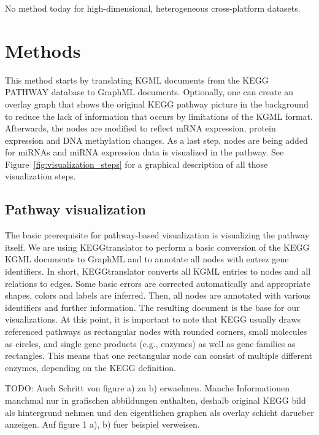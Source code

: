\documentclass{bioinfo}
\begin{document}
No method today for high-dimensional, heterogeneous cross-platform datasets.

\section{Methods}

This method starts by translating KGML documents from the KEGG PATHWAY database to GraphML documents. Optionally, one can create an overlay graph that shows the original KEGG pathway picture in the background to reduce the lack of information that occurs by limitations of the KGML format. Afterwards, the nodes are modified to reflect mRNA expression, protein expression and DNA methylation changes. As a last step, nodes are being added for miRNAs and miRNA expression data is visualized in the pathway. See Figure~\ref{fig:visualization_steps} for a graphical description of all those visualization steps.


\subsection{Pathway visualization}

The basic prerequisite for pathway-based visualization is visualizing the pathway itself. We are using KEGGtranslator \citep[see][]{Wrzodek2011} to perform a basic conversion of the KEGG KGML documents to GraphML and to annotate all nodes with entrez gene identifiers. In short, KEGGtranslator converts all KGML entries to nodes and all relations to edges. Some basic errors are corrected automatically and appropriate shapes, colors and labels are inferred. Then, all nodes are annotated with various identifiers and further information. The resulting document is the base for our visualizations. At this point, it is important to note that KEGG usually draws referenced pathways as rectangular nodes with rounded corners, small molecules as circles, and single gene products (e.g., enzymes) as well as gene families as rectangles. This means that one rectangular node can consist of multiple different enzymes, depending on the KEGG definition.

TODO: Auch Schritt von figure a) zu b) erwaehnen. Manche Informationen manchmal nur in grafischen abbildungen enthalten, deshalb original KEGG bild als hintergrund nehmen und den eigentlichen graphen als overlay schicht darueber anzeigen. Auf figure 1 a), b) fuer beispiel verweisen.
\end{document}
